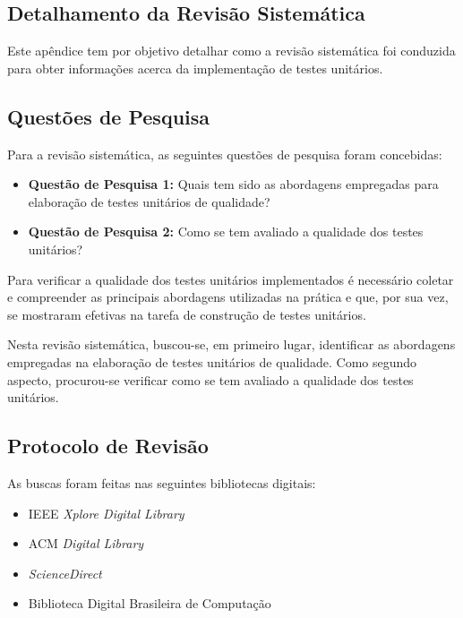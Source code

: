 \begin{apendicesenv}

\partapendices

\chapter{Detalhamento da Revisão Sistemática}

Este apêndice tem por objetivo detalhar como a revisão sistemática foi conduzida para obter informações acerca da implementação de testes unitários.

\section{Questões de Pesquisa}

Para a revisão sistemática, as seguintes questões de pesquisa foram concebidas:

\begin{itemize}
	\item \textbf{Questão de Pesquisa 1:} Quais tem sido as abordagens empregadas para elaboração de testes unitários de qualidade?
	\item \textbf{Questão de Pesquisa 2:} Como se tem avaliado a qualidade dos testes unitários?
\end{itemize}

Para verificar a qualidade dos testes unitários implementados é necessário coletar e compreender as principais abordagens utilizadas na prática e que, por sua vez, se mostraram efetivas na tarefa de construção de testes unitários.

Nesta revisão sistemática, buscou-se, em primeiro lugar, identificar as abordagens empregadas na elaboração de testes unitários de qualidade. Como segundo aspecto, procurou-se verificar como se tem avaliado a qualidade dos testes unitários.

\section{Protocolo de Revisão}

As buscas foram feitas nas seguintes bibliotecas digitais:

\begin{itemize}
	\item IEEE \textit{Xplore Digital Library}
	\item ACM \textit{Digital Library}
	\item \textit{ScienceDirect}
	\item Biblioteca Digital Brasileira de Computação
\end{itemize}


\end{apendicesenv}
